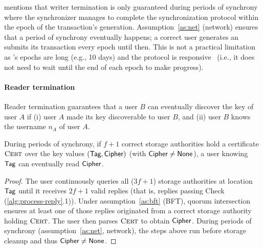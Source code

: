  mentions that writer termination is only guaranteed during periods of synchrony where the synchronizer manages to complete the synchronization protocol within the epoch of the transaction's generation. Assumption~\ref{as:net} (network) ensures that a period of synchrony eventually happens; a correct user generates an submits its transaction every epoch until then. This is not a practical limitation as \sysname's epochs are long (e.g., 10 days) and the protocol is responsive~\cite{hotstuff} (i.e., it does not need to wait until the end of each epoch to make progress).

\paragraph{Reader termination}
Reader termination guarantees that a user $B$ can eventually discover the key of user $A$ if (i) user $A$ made its key discoverable to user $B$, and (ii) user $B$ knows the username $n_A$ of user $A$.

\begin{lemma} \label{th:can-read-val}
    During periods of synchrony, if $f+1$ correct storage authorities hold a certificate $\textsc{Cert}$ over the key values $(\textsf{Tag}, \textsf{Cipher})$ (with $\textsf{Cipher} \neq \textsf{None}$), a user knowing $\textsf{Tag}$ can eventually read $\textsf{Cipher}$.
\end{lemma}
\begin{proof}
    The user continuously queries all ($3f+1$) storage authorities at location $\textsf{Tag}$ until it receives $2f+1$ valid replies (that is, replies passing Check (\ref{alg:process-reply}.1)).
    Under assumption~\ref{as:bft} (BFT), quorum intersection ensures at least one of those replies originated from a correct storage authority holding $\textsc{Cert}$.
    The user then parses $\textsc{Cert}$ to obtain $\textsf{Cipher}$. During periods of synchrony (assumption~\ref{as:net}, network), the steps above run before storage cleanup and thus $\textsf{Cipher} \neq \textsf{None}$.
\end{proof}


